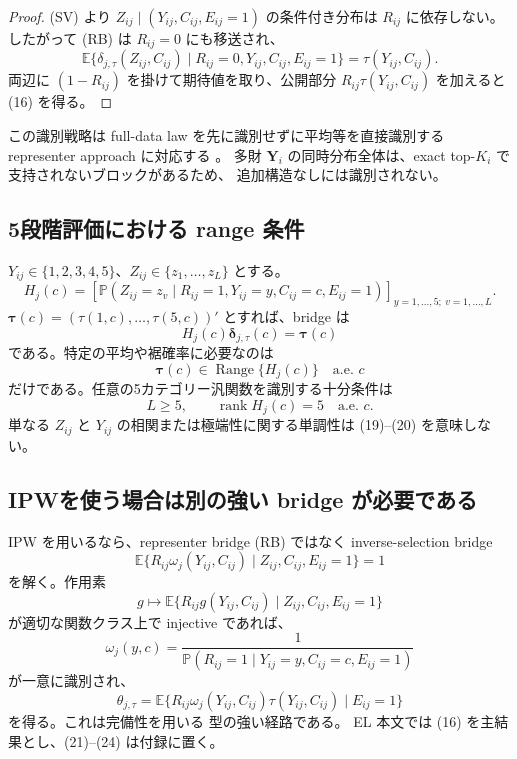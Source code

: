 \documentclass[a4paper,11pt]{ltjsarticle}
\newcommand{\E}{\mathbb E}
\newcommand{\Prb}{\mathbb P}
\newcommand{\1}{\mathbf 1}
\newcommand{\Range}{\operatorname{Range}}
\newcommand{\rank}{\operatorname{rank}}
\theoremstyle{definition}
\theoremstyle{plain}
\theoremstyle{remark}
\begin{document}
\begin{proof}
(SV) より $Z_{ij}\mid(Y_{ij},C_{ij},E_{ij}=1)$ の条件付き分布は
$R_{ij}$ に依存しない。したがって (RB) は $R_{ij}=0$ にも移送され、
\[
 \E\{\delta_{j,\tau}(Z_{ij},C_{ij})
 \mid R_{ij}=0,Y_{ij},C_{ij},E_{ij}=1\}
 =\tau(Y_{ij},C_{ij}).
\]
両辺に $(1-R_{ij})$ を掛けて期待値を取り、公開部分
$R_{ij}\tau(Y_{ij},C_{ij})$ を加えると (16) を得る。
\end{proof}

この識別戦略は full-data law を先に識別せずに平均等を直接識別する
representer approach に対応する \parencite{LiMiaoTchetgen2023}。
多財 $\bm Y_i$ の同時分布全体は、exact top-$K_i$ で支持されないブロックがあるため、
追加構造なしには識別されない。

\subsection{5段階評価における range 条件}

$Y_{ij}\in\{1,2,3,4,5\}$、$Z_{ij}\in\{z_1,\ldots,z_L\}$ とする。
\[
 H_j(c)
 =\left[
 \Prb(Z_{ij}=z_v\mid R_{ij}=1,Y_{ij}=y,C_{ij}=c,E_{ij}=1)
 \right]_{y=1,\ldots,5;\ v=1,\ldots,L}.
 \tag{17}
\]
$\bm\tau(c)=(\tau(1,c),\ldots,\tau(5,c))'$ とすれば、bridge は
\[
 H_j(c)\bm\delta_{j,\tau}(c)=\bm\tau(c)
 \tag{18}
\]
である。特定の平均や裾確率に必要なのは
\[
 \bm\tau(c)\in\Range\{H_j(c)\}
 \quad\text{a.e. }c
 \tag{19}
\]
だけである。任意の5カテゴリー汎関数を識別する十分条件は
\[
 L\ge5,
 \qquad \rank H_j(c)=5
 \quad\text{a.e. }c.
 \tag{20}
\]
単なる $Z_{ij}$ と $Y_{ij}$ の相関または極端性に関する単調性は (19)--(20) を意味しない。

\subsection{IPWを使う場合は別の強い bridge が必要である}

IPW を用いるなら、representer bridge (RB) ではなく inverse-selection bridge
\[
 \E\{R_{ij}\omega_j(Y_{ij},C_{ij})\mid
 Z_{ij},C_{ij},E_{ij}=1\}=1
 \tag{21}
\]
を解く。作用素
\[
 g\mapsto
 \E\{R_{ij}g(Y_{ij},C_{ij})\mid Z_{ij},C_{ij},E_{ij}=1\}
 \tag{22}
\]
が適切な関数クラス上で injective であれば、
\[
 \omega_j(y,c)
 =\frac{1}{\Prb(R_{ij}=1\mid Y_{ij}=y,C_{ij}=c,E_{ij}=1)}
 \tag{23}
\]
が一意に識別され、
\[
 \theta_{j,\tau}
 =\E\{R_{ij}\omega_j(Y_{ij},C_{ij})
 \tau(Y_{ij},C_{ij})\mid E_{ij}=1\}
 \tag{24}
\]
を得る。これは完備性を用いる \textcite{dHaultfoeuille2010} 型の強い経路である。
EL 本文では (16) を主結果とし、(21)--(24) は付録に置く。
\end{document}
